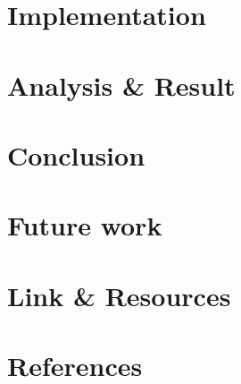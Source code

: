 \documentclass[a4paper,15pt]{article}
\begin{document}
\clearpage
\section{Implementation}



\clearpage
\section{Analysis \& Result}


\clearpage
\section{Conclusion}


\section{Future work}


\clearpage
\section{Link \& Resources}


\section{References}
\nocite{*}
 
\printbibliography
\end{document}
